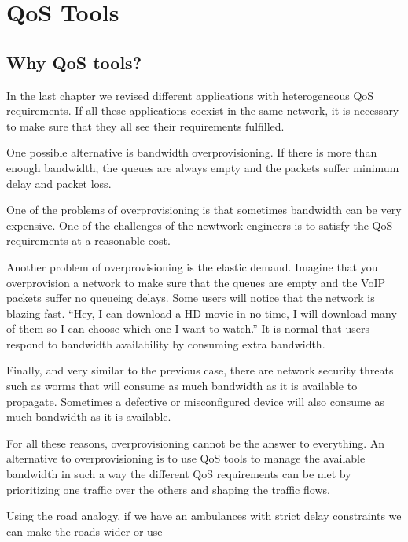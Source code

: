 \chapter{QoS Tools}
\section{Why QoS tools?}
In the last chapter we revised different applications with heterogeneous QoS requirements.
If all these applications coexist in the same network, it is necessary to make sure that they all see their requirements fulfilled.

One possible alternative is bandwidth overprovisioning.
If there is more than enough bandwidth, the queues are always empty and the packets suffer minimum delay and packet loss.

One of the problems of overprovisioning is that sometimes bandwidth can be very expensive.
One of the challenges of the newtwork engineers is to satisfy the QoS requirements at a reasonable cost.

Another problem of overprovisioning is the elastic demand.
Imagine that you overprovision a network to make sure that the queues are empty and the VoIP packets suffer no queueing delays.
Some users will notice that the network is blazing fast.
``Hey, I can download a HD movie in no time, I will download many of them so I can choose which one I want to watch.''
It is normal that users respond to bandwidth availability by consuming extra bandwidth.

Finally, and very similar to the previous case, there are network security threats such as worms that will consume as much bandwidth as it is available to propagate.
Sometimes a defective or misconfigured device will also consume as much bandwidth as it is available.

For all these reasons, overprovisioning cannot be the answer to everything.
An alternative to overprovisioning is to use QoS tools to manage the available bandwidth in such a way the different QoS requirements can be met by prioritizing one traffic over the others and shaping the traffic flows.

Using the road analogy, if we have an ambulances with strict delay constraints we can make the roads wider or use 


